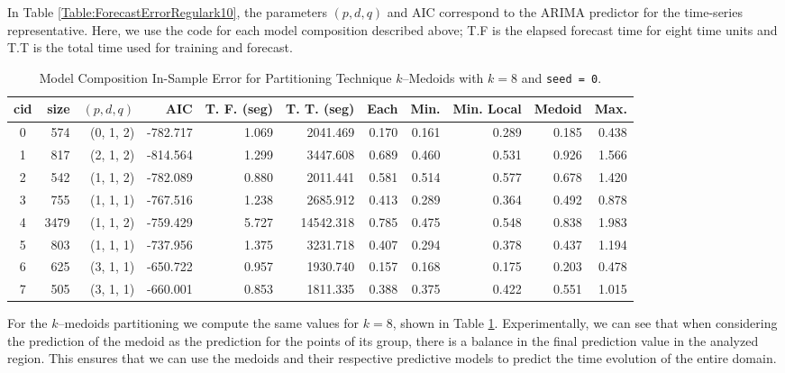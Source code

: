 In Table \ref{Table:ForecastErrorRegulark10}, the parameters $(p, d, q)$ and  AIC correspond to the ARIMA predictor for the time-series representative. Here, we use the code for each model composition described above; T.F is the elapsed forecast time for eight time units and T.T is the total time used for training and forecast. 
\begin{table}[h]
	\centering
	\tiny
	\begin{tabular}{|c|r|r|r|r|r|r|r|r|r|r|}
		\hline
		cid & size & $(p, d, q)$ & AIC & T. F. (seg) & T. T. (seg) & Each & Min. & Min. Local & Medoid & Max. \\
		\hline
		0 &  574 & (0, 1, 2) & -782.717 & 1.069	&  2041.469	& 0.170	& 0.161	& 0.289	& 0.185	& 0.438	 \\
		1 &  817 & (2, 1, 2) & -814.564 & 1.299	&  3447.608	& 0.689	& 0.460	& 0.531	& 0.926	& 1.566	 \\
		2 &  542 & (1, 1, 2) & -782.089 & 0.880	&  2011.441	& 0.581	& 0.514	& 0.577	& 0.678	& 1.420	 \\
		3 &  755 & (1, 1, 1) & -767.516 & 1.238	&  2685.912	& 0.413	& 0.289	& 0.364	& 0.492	& 0.878	 \\
		4 & 3479 & (1, 1, 2) & -759.429 & 5.727	& 14542.318	& 0.785	& 0.475	& 0.548	& 0.838	& 1.983	 \\
		5 &  803 & (1, 1, 1) & -737.956 & 1.375	&  3231.718	& 0.407	& 0.294	& 0.378	& 0.437	& 1.194	 \\
		6 &  625 & (3, 1, 1) & -650.722 & 0.957	&  1930.740	& 0.157	& 0.168	& 0.175	& 0.203	& 0.478	 \\
		7 &  505 & (3, 1, 1) & -660.001 & 0.853	&  1811.335	& 0.388	& 0.375	& 0.422	& 0.551	& 1.015	 \\ \hline	
	\end{tabular}
	\caption{Model Composition In-Sample Error for Partitioning Technique  $k$--Medoids with $k=8$ and \texttt{seed = 0}.}
	\label{Table:ForecastErrorkMedoidsk8}
\end{table}

For the $k$--medoids partitioning we compute the same values for $k=8$, shown in Table \ref{Table:ForecastErrorkMedoidsk8}. Experimentally, we can see that when considering the prediction of the medoid as the prediction for the points of its group, there is a balance in the final prediction value in the analyzed region. This ensures that we can use the medoids and their respective predictive models to predict the time evolution of the entire domain.

